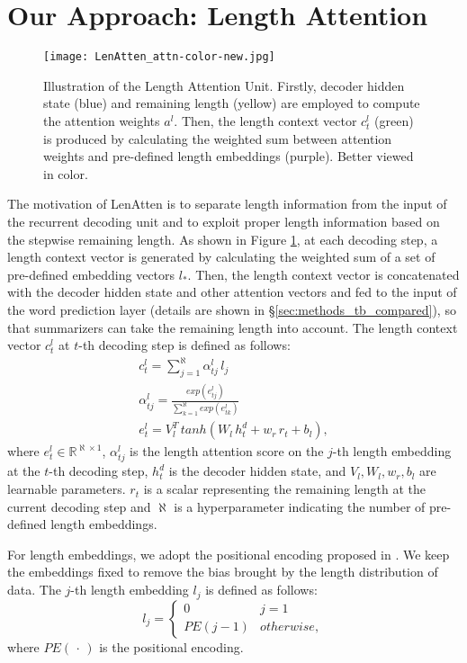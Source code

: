 \documentclass[11pt,a4paper]{article}
\begin{document}
\section{Our Approach: Length Attention}
\begin{figure}[htbp]
  \centering
  \texttt{[image: LenAtten\_attn-color-new.jpg]}
  \caption{Illustration of the Length Attention Unit. Firstly, decoder hidden state (blue) and remaining length (yellow) are employed to compute the attention weights $a^l$. Then, the length context vector $c^l_t$ (green) is produced by calculating the weighted sum between attention weights and pre-defined length embeddings (purple). Better viewed in color.}
  \label{fig:lenatten-mechansim}
\end{figure}
The motivation of LenAtten is to separate length information from the input of the recurrent decoding unit and to exploit proper length information based on the stepwise remaining length. As shown in Figure \ref{fig:lenatten-mechansim}, at each decoding step, a length context vector is generated by calculating the weighted sum of a set of pre-defined embedding vectors $l_*$. Then, the length context vector is concatenated with the decoder hidden state and other attention vectors and fed to the input of the word prediction layer (details are shown in \S \ref{sec:methods_tb_compared}), so that summarizers can take the remaining length into account. The length context vector $c^l_t$ at $t$-th decoding step is defined as follows:
\begin{gather}
  c^l_t = \sum_{j=1}^{\aleph} \alpha^l_{tj}\, l_j\\
  \alpha^l_{tj} = \frac{exp(e^l_{tj})}{\sum_{k=1}^{\aleph} exp(e^l_{tk})}\\
  e^l_t = V^T_{l} \, tanh(W_{l} \, h^d_t + w_r \, r_t + b_{l}),
\end{gather} where $e^l_t \in \mathbb{R}^{{\aleph}\times 1}$, $\alpha^l_{tj}$ is the length attention score on the $j$-th length embedding at the $t$-th decoding step, $h^d_t$ is the decoder hidden state, and $V_{l}, W_{l}, w_r, b_{l}$ are learnable parameters. $r_t$ is a scalar representing the remaining length at the current decoding step and ${\aleph}$ is a hyperparameter indicating the number of pre-defined length embeddings. 

For length embeddings, we adopt the positional encoding proposed in \citet{DBLP:conf/nips/VaswaniSPUJGKP17}. We keep the embeddings fixed to remove the bias brought by the length distribution of data. The $j$-th length embedding $l_j$ is defined as follows:
\begin{equation}
  l_{j} =
  \begin{cases}
   0 & j = 1 \\
   PE(j-1) & otherwise,
  \end{cases}
\end{equation}
where $PE(\, \cdot \,)$ is the positional encoding.
\end{document}
